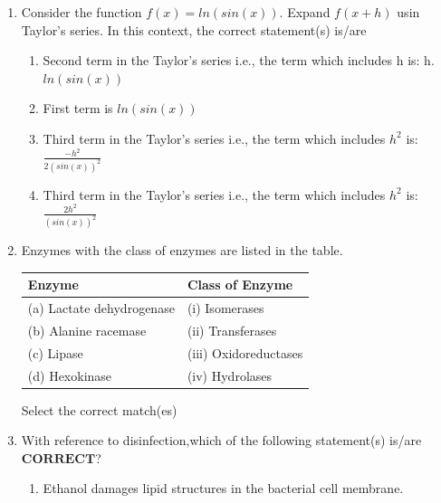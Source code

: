 \documentclass[journal]{IEEEtran}
\numberwithin{equation}{enumi}
\numberwithin{figure}{enumi}
\begin{document}
\begin{enumerate}[start=1, label={Q\arabic*.}]
\item Consider the function $f(x) = ln(sin(x))$.
\vspace{0.1cm}
Expand $f(x + h)$ usin Taylor's series. In this context, the correct statement(s) is/are
 \vspace{0.1cm}
\begin{enumerate}
  \item Second term in the Taylor's series i.e., the term which includes h is: h.$ln(sin(x))$
  \item First term is $ln(sin(x))$
  \item Third term in the Taylor's series i.e., the term which includes $h^2$ is: $\frac{-h^2}{2(sin(x))^2}$
  \item Third term in the Taylor's series i.e., the term which includes $h^2$ is:$\frac{2h^2}{(sin(x))^2}$
  \end{enumerate}
\item Enzymes with the class of enzymes are listed in the table.
\begin{center}
\renewcommand{\arraystretch}{1.1}
\setlength{\tabcolsep}{10pt}
\begin{tabular}{|l|l|}
\hline
\textbf{Enzyme} & \textbf{Class of Enzyme} \\ \hline
(a) Lactate dehydrogenase & (i) Isomerases \\ \hline
(b) Alanine racemase       & (ii) Transferases \\ \hline
(c) Lipase                 & (iii) Oxidoreductases \\ \hline
(d) Hexokinase             & (iv) Hydrolases \\ \hline
\end{tabular}
\end{center}
Select the correct match(es)
 \begin{enumerate} 
  \end{enumerate}
\item With reference to disinfection,which of the following statement(s) is/are $\mathbf{CORRECT}$?
\begin{enumerate}
  \item Ethanol damages lipid structures in the bacterial cell membrane.

\end{enumerate}
\end{enumerate}
\end{document}
